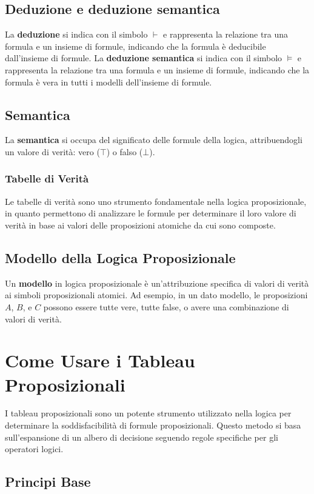 \documentclass{article}
\begin{document}
\subsection{Deduzione e deduzione semantica}
La \textbf{deduzione} si indica con il simbolo $\vdash$ e rappresenta la relazione tra una formula e un insieme di formule, indicando che la formula è deducibile dall'insieme di formule.
La \textbf{deduzione semantica} si indica con il simbolo $\models$ e rappresenta la relazione tra una formula e un insieme di formule, indicando che la formula è vera in tutti i modelli dell'insieme di formule.

\subsection{Semantica}
La \textbf{semantica} si occupa del significato delle formule della logica, attribuendogli un valore di verità: vero ($\top$) o falso ($\bot$).

\subsubsection{Tabelle di Verità}
Le tabelle di verità sono uno strumento fondamentale nella logica proposizionale, in quanto permettono di analizzare le formule per determinare il loro valore di verità in base ai valori delle proposizioni atomiche da cui sono composte.

\subsection{Modello della Logica Proposizionale}
Un \textbf{modello} in logica proposizionale è un'attribuzione specifica di valori di verità ai simboli proposizionali atomici. Ad esempio, in un dato modello, le proposizioni $A$, $B$, e $C$ possono essere tutte vere, tutte false, o avere una combinazione di valori di verità.
\newpage
\section{Come Usare i Tableau Proposizionali}

I tableau proposizionali sono un potente strumento utilizzato nella logica per determinare la soddisfacibilità di formule proposizionali. Questo metodo si basa sull'espansione di un albero di decisione seguendo regole specifiche per gli operatori logici.

\subsection{Principi Base}
\end{document}
